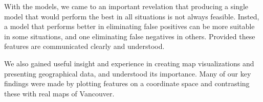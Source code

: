 With the models, we came to an important revelation that producing a single model that would perform the best in all situations is not always feasible. Insted, a model that performs better in eliminating false positives can be more suitable in some situations, and one eliminating false negatives in others. Provided these features are communicated clearly and understood. 

We also gained useful insight and experience in creating map visualizations and presenting geographical data, and understood its importance. Many of our key findings were made by plotting features on a coordinate space and contrasting these with real maps of Vancouver.


